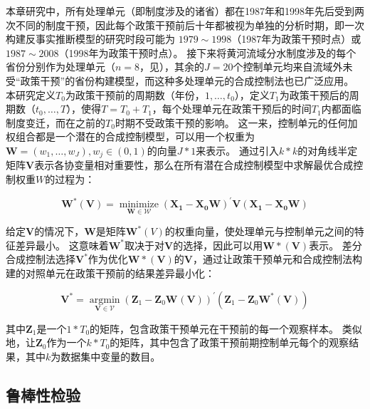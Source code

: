 本章研究中，所有处理单元（即制度涉及的诸省）都在1987年和1998年先后受到两次不同的制度干预，因此每个政策干预前后十年都被视为单独的分析时期，即一次构建反事实推断模型的研究时段可能为 $1979 \sim 1998$（1987年为政策干预时点）或 $1987 \sim 2008$（1998年为政策干预时点）。
接下来将黄河流域分水制度涉及的每个省份分别作为处理单元（$n=8$，见\textbf{}），其余的$J=20$个控制单元均来自流域外未受“政策干预”的省份构建模型，而这种多处理单元的合成控制法也已广泛应用\cite{abadie2021}。
本研究定义$T_0$为政策干预前的周期数（年份，$1,\ldots,t_0$），定义$T_1$为政策干预后的周期数（$t_0,\ldots,T$），使得$T = T_0+ T_1$，每个处理单元在政策干预后的时间$T_1$内都面临制度变迁，而在之前的$T_0$时期不受政策干预的影响。
这一来，控制单元的任何加权组合都是一个潜在的合成控制模型，可以用一个权重为$\mathbf{W} = (w_{1},\ldots,w_{J}), w_j \in (0, 1)$的向量$J * 1$来表示。
通过引入$k * k$的对角线半定矩阵$\mathbf{V}$表示各协变量相对重要性，那么在所有潜在合成控制模型中求解最优合成控制权重$W$的过程为：

\begin{equation}
    \mathbf{W^{*}(V)}=\underset{\mathbf{W} \in \mathcal{W}}{\operatorname{minimize}}{\left(\mathbf{X}_{\mathbf{1}}-\mathbf{X}_{\mathbf{0}} \mathbf{W}\right)}^{\prime} {\mathbf{V}}{\left(\mathbf{X}_{\mathbf{1}}-\mathbf{X}_{\mathbf{0}} \mathbf{W}\right)}
\end{equation}

给定$\mathbf{V}$的情况下，$\mathbf{W}$是矩阵$\mathbf{W}^{*}(V)$的权重向量，使处理单元与控制单元之间的特征差异最小。
这意味着$\mathbf{W^{*}}$取决于对$\mathbf{V}$的选择，因此可以用$\mathbf{W*(V)}$表示。
差分合成控制法选择$\mathbf{V^{*}}$作为优化$\mathbf{W*(V)}$的$\mathbf{V}$，通过让政策干预单元和合成控制法构建的对照单元在政策干预前的结果差异最小化：

\begin{equation}
    \mathbf{V}^{*}=\underset{\mathbf{V} \in \mathcal{V}}{\operatorname{argmin}}{\left(\mathbf{Z}_{1}-\mathbf{Z}_{0} \mathbf{W}^{}(\mathbf{V})\right)}^{\prime}{\left(\mathbf{Z}_{1}-\mathbf{Z}_{0} \mathbf{W}^{*}(\mathbf{V})\right)}
\end{equation}

其中$\mathbf{Z}_{1}$是一个$1*T_0$的矩阵，包含政策干预单元在干预前的每一个观察样本。
类似地，让$\mathbf{Z}_{0}$作为一个$k * T_0$的矩阵，其中包含了政策干预前期控制单元每个的观察结果，其中$k$为数据集中变量的数目。

\subsection{鲁棒性检验}

